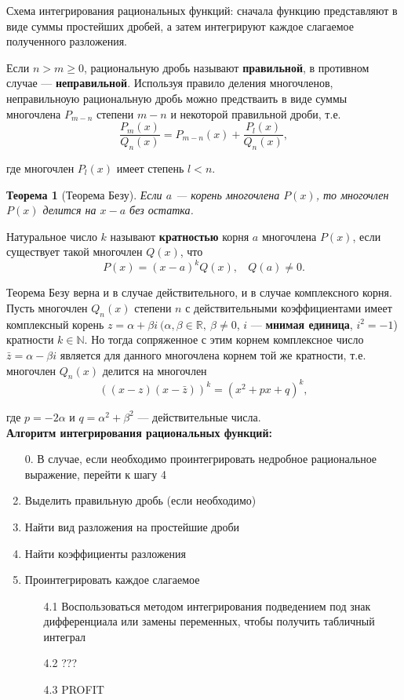 \documentclass[12pt]{report}
\numberwithin{equation}{section}
\newtheorem{theorem}{Теорема}[section]
\begin{document}
Схема интегрирования рациональных функций: сначала функцию представляют в виде суммы простейших дробей, а затем интегрируют каждое слагаемое полученного разложения.

Если $n > m \geqslant 0$,  рациональную дробь называют \textbf{правильной}, в противном случае --- \textbf{неправильной}. Используя правило деления многочленов, неправильноую рациональную дробь можно предстваить в виде суммы многочлена $P_{m-n}$ степени  $m-n$ и некоторой правильной дроби, т.е.
\[ \frac{P_m(x)}{Q_n(x)} = P_{m-n}(x) + \frac{P_l(x)}{Q_n(x)},\]

где многочлен $P_l(x)$ имеет степень $l < n$.

\begin{theorem}[Теорема Безу]
Если $a$ --- корень многочлена $P(x)$, то многочлен $P(x)$ делится на $x-a$ без остатка.
\end{theorem}
 
Натуральное число $k$ называют \textbf{кратностью} корня $a$ многочлена $P(x)$, если существует такой многочлен $Q(x)$, что
\[ P(x) = (x-a)^k Q(x),~~~~Q(a) \neq 0.\]

Теорема Безу верна и в случае действительного, и в случае комплексного корня. Пусть многочлен $Q_n(x)$ степени $n$ с действительными коэффициентами имеет комплексный корень $z = \alpha + \beta i~(\alpha, \beta \in \mathbb{R},~\beta \neq 0$, $i$ --- \textbf{мнимая единица}, $i^2 = -1$) кратности $k \in \mathbb{N}$. Но тогда сопряженное с этим корнем комплексное число $\bar{z} = \alpha - \beta i$ является для данного многочлена корнем той же кратности, т.е. многочлен $Q_n(x)$ делится на многочлен
\[ ((x-z)(x-\bar{z}))^k = (x^2 + px + q)^k,\]

где $p = -2\alpha$ и $q = \alpha^2 + \beta^2$ --- действительные числа.\\

\textbf{Алгоритм интегрирования рациональных функций:}

\begin{enumerate}
\item [0.] В случае, если необходимо проинтегрировать недробное рациональное выражение, перейти к шагу 4
\item Выделить правильную дробь (если необходимо)
\item Найти вид разложения на простейшие дроби
\item Найти коэффициенты разложения
\item Проинтегрировать каждое слагаемое
    \begin{enumerate}
    \item [4.1] Воспользоваться методом интегрирования подведением под знак дифференциала или замены переменных, чтобы получить табличный интеграл
    \item [4.2] ???
    \item [4.3] PROFIT
    \end{enumerate}
\end{enumerate}
\end{document}
